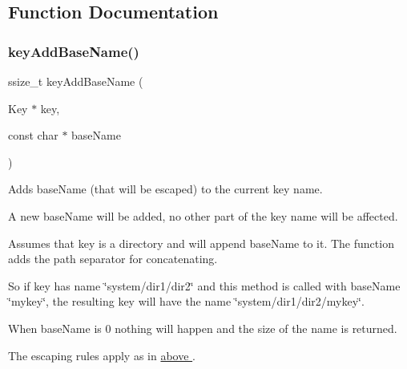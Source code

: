 \subsection{Function Documentation}
\mbox{\label{group__keyname_gaa942091fc4bd5c2699e49ddc50829524}} 
\subsubsection{\texorpdfstring{key\+Add\+Base\+Name()}{keyAddBaseName()}}
{\footnotesize\ttfamily ssize\+\_\+t key\+Add\+Base\+Name (\begin{DoxyParamCaption}\item[{Key $\ast$}]{key,  }\item[{const char $\ast$}]{base\+Name }\end{DoxyParamCaption})}



Adds {\ttfamily base\+Name} (that will be escaped) to the current key name. 

A new base\+Name will be added, no other part of the key name will be affected.

Assumes that {\ttfamily key} is a directory and will append {\ttfamily base\+Name} to it. The function adds the path separator for concatenating.

So if {\ttfamily key} has name {\ttfamily \char`\"{}system/dir1/dir2\char`\"{}} and this method is called with {\ttfamily base\+Name} {\ttfamily \char`\"{}mykey\char`\"{}}, the resulting key will have the name {\ttfamily \char`\"{}system/dir1/dir2/mykey\char`\"{}}.

When {\ttfamily base\+Name} is 0 nothing will happen and the size of the name is returned.

The escaping rules apply as in \hyperlink{group__keyname}{above }.

